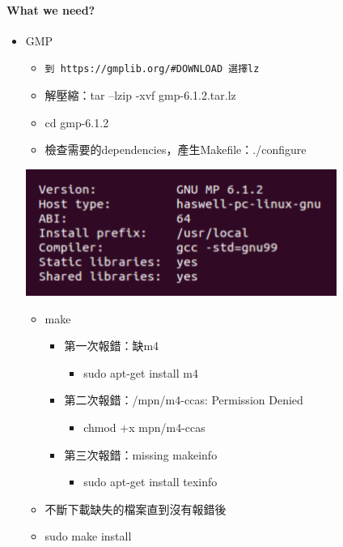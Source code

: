 \documentclass{article}
\begin{document}
\paragraph*{What we need?}
\begin{itemize}
\item GMP
\begin{itemize}
\item \verb|到 https://gmplib.org/#DOWNLOAD 選擇lz|
\item 解壓縮：tar --lzip -xvf gmp-6.1.2.tar.lz
\item cd gmp-6.1.2
\item 檢查需要的dependencies，產生Makefile：./configure
\end{itemize}
\centerline{\includegraphics[width=0.80\textwidth]{make.png}}
\begin{itemize}
\item make
\begin{itemize}
\item 第一次報錯：缺m4
\begin{itemize}
\item sudo apt-get install m4
\end{itemize}
\end{itemize}
\begin{itemize}
\item 第二次報錯：/mpn/m4-ccas: Permission Denied
\begin{itemize}
\item chmod +x mpn/m4-ccas
\end{itemize}
\end{itemize}
\begin{itemize}
\item 第三次報錯：missing makeinfo
\begin{itemize}
\item sudo apt-get install texinfo
\end{itemize}
\end{itemize}
\item 不斷下載缺失的檔案直到沒有報錯後
\item sudo make install
\end{itemize}

\end{itemize}
\end{document}
